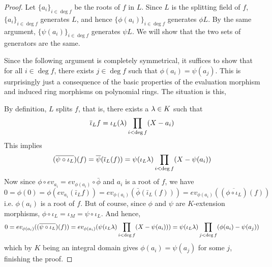 \documentclass[../book.tex]{subfiles}
\begin{document}
\begin{proof}
    Let $\{a_i\}_{i\in\deg f}$ be the roots of $f$ in $L$. 
    Since $L$ is the splitting field of $f$, $\{a_i\}_{i\in\deg f}$ generates $L$,
    and hence $\{\phi(a_i)\}_{i\in\deg f}$ generates $\phi L$. 
    By the same argument, $\{\psi(a_i)\}_{i\in\deg f}$ generates $\psi L$. 
    We will show that the two sets of generators are the same.
    
    Since the following argument is completely symmetrical, it suffices to show
    that for all $i \in \deg f$, there exists $j \in \deg f$ such that
    $\phi(a_i) = \psi(a_j)$.
    This is surprisingly just a consequence
    of the basic properties of the evaluation morphism and 
    induced ring morphisms on polynomial rings.
    The situation is this, 
    \begin{figure}[H]
        \centering
    \end{figure}
    By definition, $L$ splits $f$, that is, there exists a $\lambda \in K$ such that 
    \[\overline{\iota}_L f = \iota_L(\lambda) \prod_{i < \deg f}(X - a_i)\]
    This implies \[
        (\overline{\psi \circ \iota_L})(f) 
        = \overline{\psi}(\overline{\iota}_L(f))
        = \psi(\iota_L \lambda) \prod_{i < \deg f} (X-\psi(a_i))
    \]
    Now since $\phi \circ ev_{a_i} = ev_{\phi(a_i)} \circ \bar\phi$
    and $a_i$ is a root of $f$, we have \[
        0 = \phi(0) = \phi (ev_{a_i} (\bar\iota_L f)) 
        = ev_{\phi(a_i)} (\bar\phi(\bar\iota_L (f)))
        = ev_{\phi(a_i)}((\overline{\phi \circ \iota_L}) (f))
    \]
    i.e. $\phi(a_i)$ is a root of $f$. 
    But of course, since $\phi$ and $\psi$ are $K$-extension morphisms,
    $\phi \circ \iota_L = \iota_M = \psi \circ \iota_L$.
    And hence, \[
        0 = ev_{\phi(a_i)}( (\overline{\psi \circ \iota_L})(f) )
        = ev_{\phi(a_i)} (\psi(\iota_L \lambda) \prod_{i < \deg f} (X-\psi(a_i)))
        = \psi(\iota_L \lambda) \prod_{j < \deg f} (\phi(a_i) -\psi(a_j))
    \]
    which by $K$ being an integral domain gives $\phi(a_i) = \psi(a_j)$
    for some $j$, finishing the proof. 
\end{proof}
\end{document}
